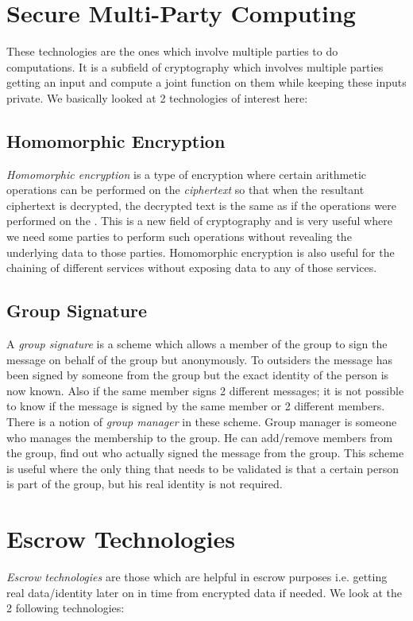 \section{Secure Multi-Party Computing}
These technologies are the ones which involve multiple parties to do computations\cite{goldreich1998secure}. It is a subfield of cryptography which involves multiple parties getting an input and compute a joint function on them while keeping these inputs private. We basically looked at 2 technologies of interest here:
\subsection{Homomorphic Encryption}
\textit{Homomorphic encryption}\cite{rappe2005homomorphic} is a type of encryption where certain arithmetic operations can be performed on the \textit{ciphertext} so that when the resultant ciphertext is decrypted, the decrypted text is the same as if the operations were performed on the \cite{plaintext}. This is a new field of cryptography and is very useful where we need some parties to perform such operations without revealing the underlying data to those parties. Homomorphic encryption is also useful for the chaining of different services without exposing data to any of those services.
\subsection{Group Signature}
A \textit{group signature}\cite{ateniese2000practical} is a scheme which allows a member of the group to sign the message on behalf of the group but anonymously. To outsiders the message has been signed by someone from the group but the exact identity of the person is now known. Also if the same member signs 2 different messages; it is not possible to know if the message is signed by the same member or 2 different members. There is a notion of \textit{group manager} in these scheme. Group manager is someone who manages the membership to the group. He can add/remove members from the group, find out who actually signed the message from the group. This scheme is useful where the only thing that needs to be validated is that a certain person is part of the group, but his real identity is not required.
\section{Escrow Technologies}
\textit{Escrow technologies} are those which are helpful in escrow purposes i.e. getting real data/identity later on in time from encrypted data if needed. We look at the 2 following technologies:
